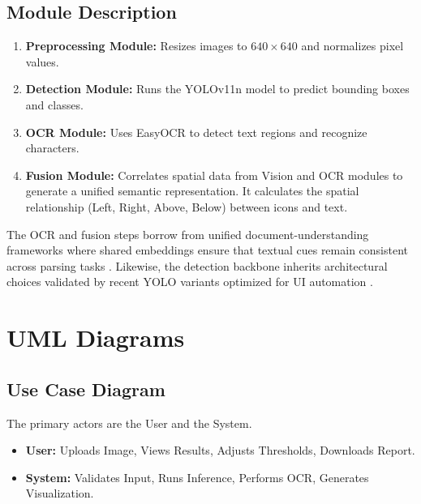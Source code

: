 \documentclass[11pt,a4paper]{report}
\begin{document}
\subsection{Module Description}
\begin{enumerate}
    \item \textbf{Preprocessing Module:} Resizes images to $640 \times 640$ and normalizes pixel values.
    \item \textbf{Detection Module:} Runs the YOLOv11n model to predict bounding boxes and classes.
    \item \textbf{OCR Module:} Uses EasyOCR to detect text regions and recognize characters.
    \item \textbf{Fusion Module:} Correlates spatial data from Vision and OCR modules to generate a unified semantic representation. It calculates the spatial relationship (Left, Right, Above, Below) between icons and text.
\end{enumerate}
The OCR and fusion steps borrow from unified document-understanding frameworks where shared embeddings ensure that textual cues remain consistent across parsing tasks \cite{unifiedtext}\cite{easyocr}. Likewise, the detection backbone inherits architectural choices validated by recent YOLO variants optimized for UI automation \cite{yolov11}\cite{uiautomation}.

\section{UML Diagrams}

\subsection{Use Case Diagram}
The primary actors are the User and the System.
\begin{itemize}
    \item \textbf{User:} Uploads Image, Views Results, Adjusts Thresholds, Downloads Report.
    \item \textbf{System:} Validates Input, Runs Inference, Performs OCR, Generates Visualization.
\end{itemize}
\end{document}
